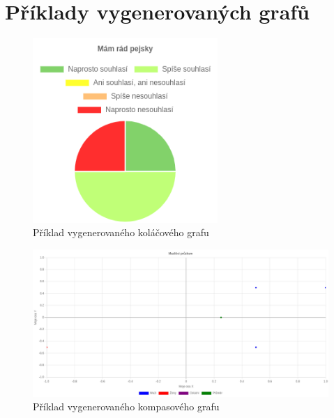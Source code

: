 \chapter{Příklady vygenerovaných grafů}

\begin{figure}[h!]
    \centering
    \includegraphics[height=7cm]{images/chartExamples/pieChart.png}
    \caption{Příklad vygenerovaného koláčového grafu}
\end{figure}

\begin{figure}[h!]
    \centering
    \includegraphics[width=\textwidth]{images/chartExamples/compass.png}
    \caption{Příklad vygenerovaného kompasového grafu}
\end{figure}